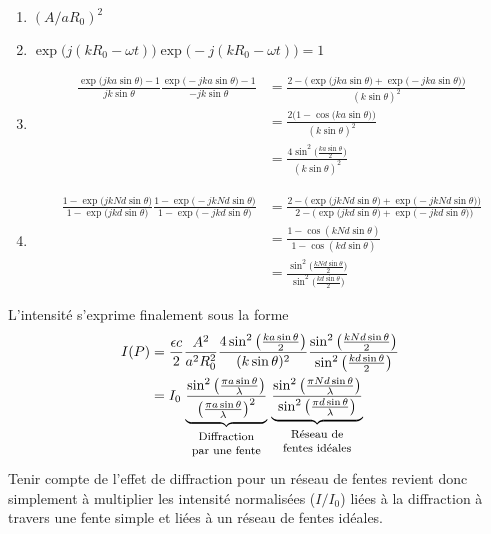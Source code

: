 \begin{enumerate}
    \item $(A/aR_0)^2$
    
    \item $\exp\big(j(kR_0-\omega t)\big)\exp\big(-j(kR_0-\omega t)\big)=1$
    
    \item 
    \begin{align*}
\frac{\exp\big(jka\sin \theta\big)-1 }{jk\sin\theta}\frac{\exp\big(-jka\sin \theta\big)-1 }{-jk\sin\theta}&=\frac{2-\Big(\exp\big(jka\sin \theta\big)+\exp\big(-jka\sin \theta\big)\Big)}{(k\sin\theta)^2}\\
&=\frac{2\Big(1-\cos\big(ka\sin \theta\big)\Big)}{(k\sin\theta)^2}\\
&=\frac{4\sin^2\big(\frac{ka\sin \theta}{2}\big)}{(k\sin\theta)^2}
\end{align*}
    
    \item
    \begin{align*}
\frac{1-\exp\big(jkNd\sin \theta\big)}{1-\exp\big(jkd\sin \theta\big)}\frac{1-\exp\big(-jkNd\sin \theta\big)}{1-\exp\big(-jkd\sin \theta\big)}
&=\frac{2-\Big(\exp\big(jkNd\sin \theta\big)+\exp\big(-jkNd\sin \theta\big)\Big)}{2-\Big(\exp\big(jkd\sin \theta\big)+\exp\big(-jkd\sin \theta\big)\Big)}\\
&=\frac{1-\cos(kNd\sin \theta)}{1-\cos(kd\sin \theta)}\\
&=\frac{\sin^2\big(\frac{kNd\sin \theta}{2}\big)}{\sin^2\big(\frac{kd\sin \theta}{2}\big)}
\end{align*}
    
\end{enumerate}
L'intensité s'exprime finalement sous la forme
\begin{align*}
I(P)&=\frac{\epsilon c}{2}\frac{A^2}{a^2R_0^2}\frac{4\sin^2\big(\frac{ka\sin \theta}{2}\big)}{(k\sin\theta)^2}\frac{\sin^2\big(\frac{kNd\sin \theta}{2}\big)}{\sin^2\big(\frac{kd\sin \theta}{2}\big)}\\
&=I_0
\underbrace{\frac{\sin^2\big(\frac{\pi a\sin \theta}{\lambda}\big)}{\big(\frac{\pi a\sin\theta}{\lambda}\big)^2}}_{%
     \footnotesize\begin{tabular}{c}Diffraction\\par une fente\end{tabular}}
\underbrace{\frac{\sin^2\big(\frac{\pi Nd\sin \theta}{\lambda}\big)}{\sin^2\big(\frac{\pi d\sin \theta}{\lambda}\big)}}_{%
     \footnotesize\begin{tabular}{c}Réseau de\\fentes idéales\end{tabular}}
\end{align*}
Tenir compte de l'effet de diffraction pour un réseau de fentes revient donc simplement à multiplier les intensité normalisées ($I/I_0$) liées à la diffraction à travers une fente simple et liées à un réseau de fentes idéales.

